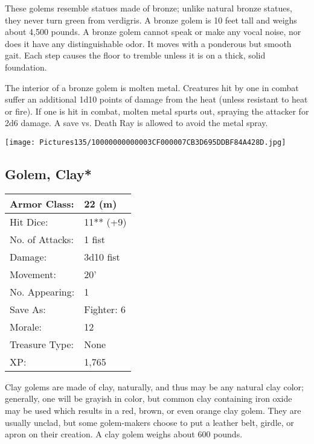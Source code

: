 \documentclass[a4paper,twoside,openany,10pt]{book}
\begin{document}
\begin{multicols}{2}
These golems resemble statues made of bronze; unlike natural bronze statues, they never turn green from verdigris. A bronze golem is 10 feet tall and weighs about 4,500 pounds. A bronze golem cannot speak or make any vocal noise, nor does it have any distinguishable odor. It moves with a ponderous but smooth gait. Each step causes the floor to tremble unless it is on a thick, solid foundation.

The interior of a bronze golem is molten metal. Creatures hit by one in combat suffer an additional 1d10 points of damage from the heat (unless resistant to heat or fire). If one is hit in combat, molten metal spurts out, spraying the attacker for 2d6 damage. A save vs. Death Ray is allowed to avoid the metal spray.

\begin{center}
	\texttt{[image: Pictures135/10000000000003CF000007CB3D695DDBF84A428D.jpg]}
\end{center}

\subsection*{Golem, Clay*}\label{golem-clay}

\begin{tabularx}{0.48\textwidth}{@{}lX@{}}
Armor Class: & 22 (m) \\\hline
Hit Dice: & 11** (+9) \\\hline
No. of Attacks: & 1 fist \\\hline
Damage: & 3d10 fist \\\hline
Movement: & 20' \\\hline
No. Appearing: & 1 \\\hline
Save As: & Fighter: 6 \\\hline
Morale: & 12 \\\hline
Treasure Type: & None \\\hline
XP: & 1,765 \\\hline
\end{tabularx}\medskip

Clay golems are made of clay, naturally, and thus may be any natural clay color; generally, one will be grayish in color, but common clay containing iron oxide may be used which results in a red, brown, or even orange clay golem. They are usually unclad, but some golem-makers choose to put a leather belt, girdle, or apron on their creation. A clay golem weighs about 600 pounds.


\end{multicols}
\end{document}
